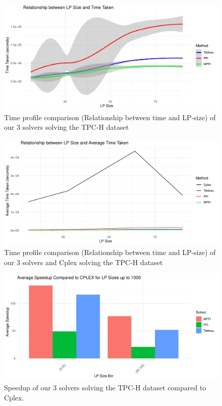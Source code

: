 \begin{figure}[!htb]
    \centering
    \includegraphics[width=\linewidth]{figures/methods_time_tpch.pdf}
    \caption{Time profile comparison (Relationship between time and LP-size) of our 3 solvers solving the TPC-H dataset }
    \label{fig:methods_time_tpch}
\end{figure}
\begin{figure}[!htb]
    \centering
    \includegraphics[width=\linewidth]{figures/cplex_vs_all_tpch.pdf}
    \caption{Time profile comparison (Relationship between time and LP-size) of our 3 solvers and Cplex solving the TPC-H dataset}
    \label{fig:cplex_time_tpch}
\end{figure}
\begin{figure}[!htb]
    \centering
    \includegraphics[width=\linewidth]{figures/speedup_tpch.pdf}
    \caption{Speedup of our 3 solvers solving the TPC-H dataset compared to Cplex. }
    \label{fig:speedup_tpch}
\end{figure}


